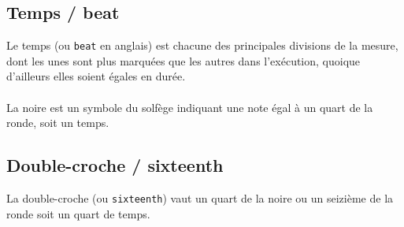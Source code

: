 \documentclass[]{article}
\begin{document}
\subsection{Temps / beat}

Le temps (ou \texttt{beat} en anglais) est chacune des principales divisions de la mesure, dont les unes sont plus marquées que les autres dans l’exécution, quoique d’ailleurs elles soient égales en durée.\\
\\
La noire est un symbole du solfège indiquant une note égal à un quart de la ronde, soit un temps.

\subsection{Double-croche / sixteenth}

La double-croche (ou \texttt{sixteenth}) vaut un quart de la noire ou un seizième de la ronde soit un quart de temps.
\end{document}
